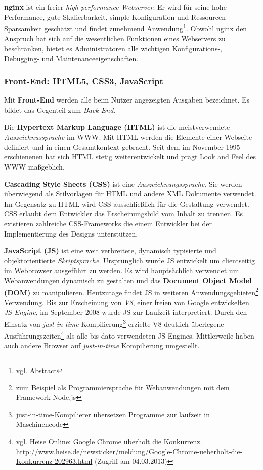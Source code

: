 \documentclass[12pt,a4paper,pointednumbers,abstracton]{scrartcl}
\begin{document}
\textbf{nginx} ist ein freier \emph{high-performance Webserver}.
Er wird für seine hohe Performance, gute Skalierbarkeit, simple Konfiguration und Ressourcen Sparsamkeit geschätzt und findet zunehmend Anwendung\footnote{vgl. \cite{Ree2008} Abstract}.
Obwohl nginx den Anspruch hat sich auf die wesentlichen Funktionen eines Webservers zu beschränken, bietet es Administratoren alle wichtigen Konfigurations-, Debugging- und Maintenanceeigenschaften.

\subsubsection{Front-End: HTML5, CSS3, JavaScript}

Mit \textbf{Front-End} werden alle beim Nutzer angezeigten Ausgaben bezeichnet. Es bildet das Gegenteil zum \emph{Back-End}. 

Die \textbf{Hypertext Markup Language (HTML)} ist die meistverwendete \emph{Auszeichnussprache} im WWW.
Mit HTML werden die Elemente einer Webseite definiert und in einen Gesamtkontext gebracht.
Seit dem im November 1995 erschienenen \cite{RFC1866} hat sich HTML stetig weiterentwickelt und prägt Look and Feel des WWW maßgeblich.

\textbf{Cascading Style Sheets (CSS)} ist eine \emph{Auszeichnungssprache}.
Sie werden überwiegend als Stilvorlagen für HTML und andere XML Dokumente verwendet.
Im Gegensatz zu HTML wird CSS ausschließlich für die Gestaltung verwendet.
CSS erlaubt dem Entwickler das Erscheinungsbild vom Inhalt zu trennen.
Es existieren zahlreiche CSS-Frameworks die einem Entwickler bei der Implementierung des Designs unterstützen.

\textbf{JavaScript (JS)} ist eine weit verbreitete, dynamisch typisierte und objektorientierte \emph{Skriptsprache}.
Ursprünglich wurde JS entwickelt um clientseitig im Webbrowser ausgeführt zu werden.
Es wird hauptsächlich verwendet um Webanwendungen dynamisch zu gestalten und das \textbf{Document Object Model (DOM)} zu manipulieren.
Heutzutage findet JS in weiteren Anwendungsgebieten\footnote{zum Beispiel als Programmiersprache für Webanwendungen mit dem Framework Node.js} Verwendung.
Bis zur Erscheinung von \emph{V8}, einer freien von Google entwickelten \emph{JS-Engine}, im September 2008 wurde JS zur Laufzeit interpretiert.
Durch den Einsatz von \emph{just-in-time} Kompilierung\footnote{just-in-time-Kompilierer übersetzen Programme zur laufzeit in Maschinencode} erzielte V8 deutlich überlegene Ausführungszeiten\footnote{vgl. Heise Online: Google Chrome überholt die Konkurrenz. \url{http://www.heise.de/newsticker/meldung/Google-Chrome-ueberholt-die-Konkurrenz-202963.html} (Zugriff am 04.03.2013)} als alle bis dato verwendeten JS-Engines.
Mittlerweile haben auch andere Browser auf \emph{just-in-time} Kompilierung umgestellt.
\end{document}
